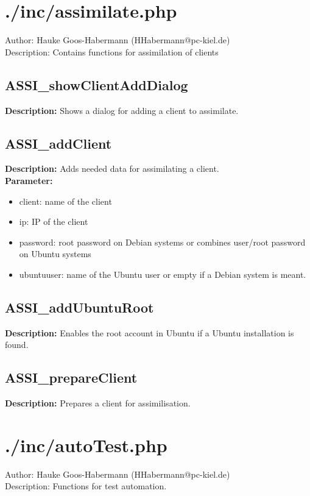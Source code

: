 
\newpage\section{./inc/assimilate.php}
 Author: Hauke Goos-Habermann (HHabermann@pc-kiel.de)\\
 Description: Contains functions for assimilation of clients\\

\subsection{ASSI\_showClientAddDialog}
\textbf{Description:} Shows a dialog for adding a client to assimilate.\\

\subsection{ASSI\_addClient}
\textbf{Description:} Adds needed data for assimilating a client.\\
\textbf{Parameter:}
\begin{itemize}
\item client: name of the client
\item ip: IP of the client
\item password: root password on Debian systems or combines user/root password on Ubuntu systems
\item ubuntuuser: name of the Ubuntu user or empty if a Debian system is meant.
\end{itemize}

\subsection{ASSI\_addUbuntuRoot}
\textbf{Description:} Enables the root account in Ubuntu if a Ubuntu installation is found.\\

\subsection{ASSI\_prepareClient}
\textbf{Description:} Prepares a client for assimilisation.\\

\newpage\section{./inc/autoTest.php}
 Author: Hauke Goos-Habermann (HHabermann@pc-kiel.de)\\
 Description: Functions for test automation.\\

